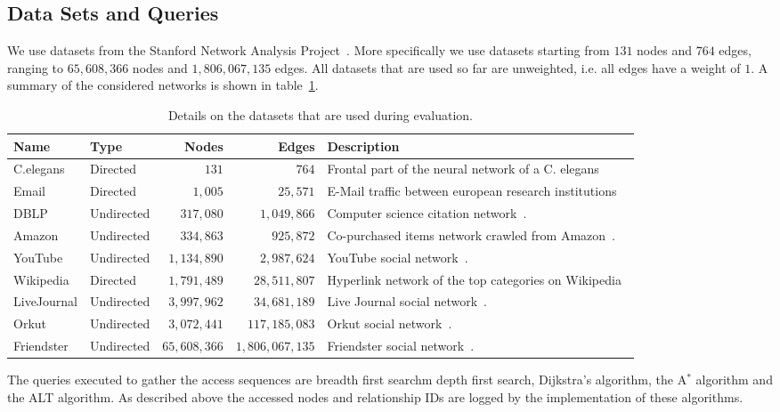     \subsection*{Data Sets and Queries}
        We use datasets from the Stanford Network Analysis Project~\autocite{snap}.
        More specifically we use datasets starting from $131$ nodes and $764$ edges, ranging to $65,608,366$ nodes and $1,806,067,135$ edges.
        All datasets that are used so far are unweighted, i.e. all edges have a weight of $1$.
        A summary of the considered networks is shown in table~\ref{datasets}.
        \begin{table}
        \begin{center}
            \begin{tabular}[c]{l l r r p{5.8cm}} \toprule
                Name & Type & Nodes & Edges & Description \\ \midrule
                 C.elegans & Directed & $131$ & $764$ & Frontal part of the neural network of a C. elegans~\autocite{celegans} \\ [0.8cm]
                 Email & Directed & $1,005$ & $25,571$ & E-Mail traffic between european research institutions~\autocite{email} \\ [0.8cm]
                 DBLP & Undirected & $317,080$ & $1,049,866$ & Computer science citation network~\autocite{lj}. \\ [0.8cm]
                 Amazon & Undirected & $334,863$ & $925,872$ & Co-purchased items network crawled from Amazon~\autocite{lj}. \\ [0.8cm]
                 YouTube & Undirected & $1,134,890$ & $2,987,624$ & YouTube social network~\autocite{mislove}. \\ [0.5cm]
                 Wikipedia & Directed & $1,791,489$ & $28,511,807$ & Hyperlink network of the top categories on Wikipedia~\autocite{wiki} \\ [0.8cm]
                LiveJournal & Undirected & $3,997,962$ & $34,681,189$ & Live Journal social network~\autocite{lj}. \\ [0.8cm]
                Orkut & Undirected & $3,072,441$ & $117,185,083$ & Orkut social network~\autocite{mislove}. \\ [0.8cm]
                Friendster & Undirected & $65,608,366$ & $1,806,067,135$ & Friendster social network~\autocite{friendster}. \\ \bottomrule
            \end{tabular}
            \end{center}
            \caption{Details on the datasets that are used during evaluation.}
            \label{datasets}
        \end{table}
        The queries executed to gather the access sequences are breadth first searchm depth first search, Dijkstra's algorithm, the A$^*$ algorithm and the ALT algorithm.
        As described above the accessed nodes and relationship IDs are logged by the implementation of these algorithms.

